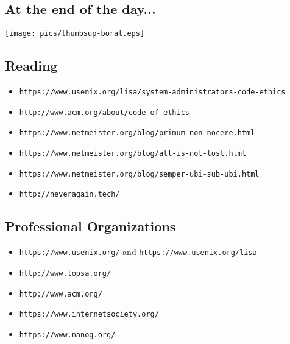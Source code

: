 \documentclass[xga]{xdvislides}
\begin{document}
\subsection{At the end of the day...}
\begin{center}
	\texttt{[image: pics/thumbsup-borat.eps]}
\end{center}

\subsection{Reading}
\begin{itemize}
	\item \verb+https://www.usenix.org/lisa/system-administrators-code-ethics+
	\item \verb+http://www.acm.org/about/code-of-ethics+
	\item \verb+https://www.netmeister.org/blog/primum-non-nocere.html+
	\item \verb+https://www.netmeister.org/blog/all-is-not-lost.html+
	\item \verb+https://www.netmeister.org/blog/semper-ubi-sub-ubi.html+
	\item \verb+http://neveragain.tech/+
\end{itemize}

\subsection{Professional Organizations}
\begin{itemize}
	\item \verb+https://www.usenix.org/+ and \verb+https://www.usenix.org/lisa+
	\item \verb+http://www.lopsa.org/+
	\item \verb+http://www.acm.org/+
	\item \verb+https://www.internetsociety.org/+
	\item \verb+https://www.nanog.org/+
\end{itemize}
\end{document}
